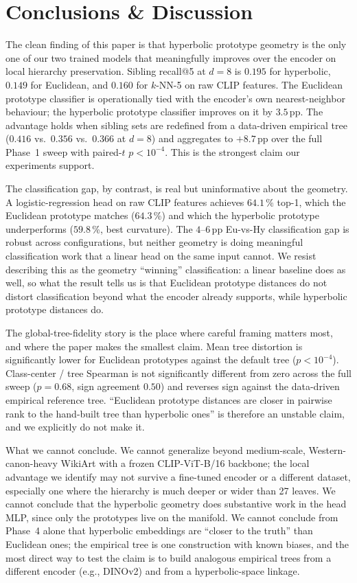 \section{Conclusions \& Discussion}
\label{sec:conclusion}

The clean finding of this paper is that hyperbolic prototype geometry
is the only one of our two trained models that meaningfully improves
over the encoder on local hierarchy preservation. Sibling recall@5 at
$d{=}8$ is $0.195$ for hyperbolic, $0.149$ for Euclidean, and $0.160$
for $k$-NN-5 on raw CLIP features. The Euclidean prototype classifier
is operationally tied with the encoder's own nearest-neighbor
behaviour; the hyperbolic prototype classifier improves on it by
$3.5$\,pp. The advantage holds when sibling sets are redefined from
a data-driven empirical tree
($0.416$ vs.\ $0.356$ vs.\ $0.366$ at $d{=}8$) and aggregates to
$+8.7$\,pp over the full Phase~1 sweep with paired-$t$
$p<10^{-4}$. This is the strongest claim our experiments support.

The classification gap, by contrast, is real but uninformative about
the geometry. A logistic-regression head on raw CLIP features
achieves $64.1$\,\% top-1, which the Euclidean prototype matches
($64.3$\,\%) and which the hyperbolic prototype underperforms
($59.8$\,\%, best curvature). The $4$--$6$\,pp Eu-vs-Hy
classification gap is robust across configurations, but neither
geometry is doing meaningful classification work that a linear head
on the same input cannot. We resist describing this as the geometry
``winning'' classification: a linear baseline does as well, so what
the result tells us is that Euclidean prototype distances do not
distort classification beyond what the encoder already supports,
while hyperbolic prototype distances do.

The global-tree-fidelity story is the place where careful framing
matters most, and where the paper makes the smallest claim. Mean
tree distortion is significantly lower for Euclidean prototypes
against the default tree ($p<10^{-4}$). Class-center / tree Spearman
is not significantly different from zero across the full sweep
($p=0.68$, sign agreement $0.50$) and reverses sign against the
data-driven empirical reference tree. ``Euclidean prototype distances
are closer in pairwise rank to the hand-built tree than hyperbolic
ones'' is therefore an unstable claim, and we explicitly do not make
it.

What we cannot conclude. We cannot generalize beyond medium-scale,
Western-canon-heavy WikiArt with a frozen CLIP-ViT-B/16 backbone;
the local advantage we identify may not survive a fine-tuned encoder
or a different dataset, especially one where the hierarchy is much
deeper or wider than 27 leaves. We cannot conclude that the
hyperbolic geometry does substantive work in the head MLP, since
only the prototypes live on the manifold. We cannot conclude from
Phase~4 alone that hyperbolic embeddings are ``closer to the truth''
than Euclidean ones; the empirical tree is one construction with
known biases, and the most direct way to test the claim is to build
analogous empirical trees from a different encoder
(e.g., DINOv2) and from a hyperbolic-space linkage.

